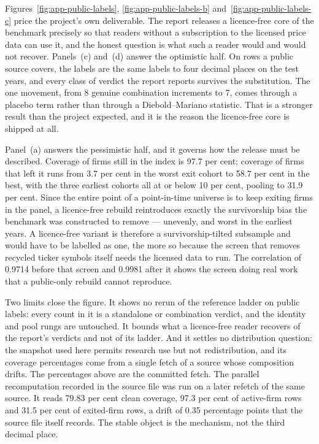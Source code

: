 Figures~\ref{fig:app-public-labels}, \ref{fig:app-public-labels-b} and~\ref{fig:app-public-labels-c} price the project's own deliverable. The
report releases a licence-free core of the benchmark precisely so that readers
without a subscription to the licensed price data can use it, and the honest
question is what such a reader would and would not recover. Panels~(c)
and~(d) answer the optimistic half. On rows a public source covers, the labels
are the same labels to four decimal places on the test years, and every class
of verdict the report reports survives the substitution. The one movement,
from 8 genuine combination increments to 7, comes through a placebo term
rather than through a Diebold--Mariano statistic. That is a stronger result
than the project expected, and it is the reason the licence-free core is
shipped at all.

Panel~(a) answers the pessimistic half, and it governs how the release must be
described. Coverage of firms still in the index is 97.7 per cent; coverage of
firms that left it runs from 3.7 per cent in the worst exit cohort to
58.7 per cent in the best, with the three earliest cohorts all at or below
10 per cent, pooling to 31.9 per cent. %
Since the entire point of a point-in-time universe is to keep exiting firms in
the panel, a licence-free rebuild reintroduces exactly the survivorship bias
the benchmark was constructed to remove --- unevenly, and worst in the
earliest years. A licence-free variant is therefore a survivorship-tilted
subsample and would have to be labelled as one, the more so because the screen
that removes recycled ticker symbols itself needs the licensed data to run.
The correlation of 0.9714 before that screen and 0.9981 after it shows the
screen doing real work that a public-only rebuild cannot reproduce.

Two limits close the figure. It shows no rerun of the reference ladder on
public labels: every count in it is a standalone or combination verdict,
and the identity and pool rungs are untouched. It bounds what a
licence-free reader recovers of the report's verdicts and not of its ladder.
And it settles no distribution question: the snapshot used here permits
research use but not redistribution, and its coverage percentages come from a
single fetch of a source whose composition drifts. The percentages above are
the committed fetch. The parallel recomputation recorded in the source file was run on a later
refetch of the same source.
It reads 79.83 per cent clean coverage, 97.3 per cent of active-firm rows and
31.5 per cent of exited-firm rows, a drift of 0.35 percentage points that the
source file itself records. %
The stable object is the mechanism, not the third decimal place.

